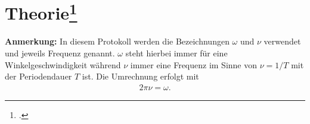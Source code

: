 

\section[Theorie]{Theorie\footcite{man:v354}}
\textbf{Anmerkung:} In diesem Protokoll werden die Bezeichnungen $\omega$ und $\nu$ verwendet und jeweils Frequenz genannt.
$\omega$ steht hierbei immer für eine Winkelgeschwindigkeit während $\nu$ immer eine Frequenz im Sinne von $\nu = 1/T$ mit
der Periodendauer $T$ ist. Die Umrechnung erfolgt mit
\begin{align*}
    2 \pi \nu = \omega .
\end{align*}


